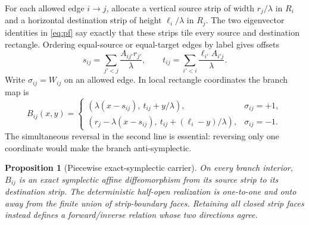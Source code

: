 \documentclass[11pt]{article}
\newtheorem{proposition}[theorem]{Proposition}
\theoremstyle{definition}
\theoremstyle{remark}
\begin{document}
For each allowed edge \(i\to j\), allocate a vertical source strip of width
\(r_j/\lambda\) in \(R_i\) and a horizontal destination strip of height
\(\ell_i/\lambda\) in \(R_j\).  The two eigenvector identities in
\eqref{eq:pf} say exactly that these strips tile every source and destination
rectangle.  Ordering equal-source or equal-target edges by label gives
offsets
\begin{equation}
 s_{ij}=\sum_{j'<j}\frac{A_{ij'}r_{j'}}{\lambda},
 \qquad
 t_{ij}=\sum_{i'<i}\frac{\ell_{i'}A_{i'j}}{\lambda}.
 \label{eq:offsets}
\end{equation}
Write \(\sigma_{ij}=W_{ij}\) on an allowed edge.  In local rectangle
coordinates the branch map is
\begin{equation}
 B_{ij}(x,y)=
 \begin{cases}
 (\lambda(x-s_{ij}),\ t_{ij}+y/\lambda),&\sigma_{ij}=+1,\\[2pt]
 (r_j-\lambda(x-s_{ij}),\ t_{ij}+(\ell_i-y)/\lambda),&\sigma_{ij}=-1.
 \end{cases}
 \label{eq:branch-map}
\end{equation}
The simultaneous reversal in the second line is essential: reversing only
one coordinate would make the branch anti-symplectic.

\begin{proposition}[Piecewise exact-symplectic carrier]
\label{prop:carrier}
On every branch interior, \(B_{ij}\) is an exact symplectic affine
diffeomorphism from its source strip to its destination strip.  The
deterministic half-open realization is one-to-one and onto away from the
finite union of strip-boundary faces.  Retaining all closed strip faces instead defines
a forward/inverse relation whose two directions agree.
\end{proposition}
\end{document}
